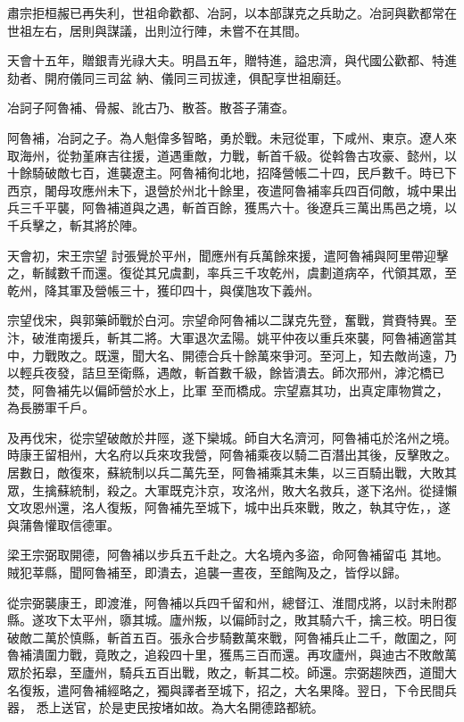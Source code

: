 \begin{pinyinscope}
 肅宗拒桓赧已再失利，世祖命歡都、冶訶，以本部謀克之兵助之。冶訶與歡都常在世祖左右，居則與謀議，出則泣行陣，未嘗不在其間。



 天會十五年，贈銀青光祿大夫。明昌五年，贈特進，謚忠濟，與代國公歡都、特進劾者、開府儀同三司盆
 納、儀同三司拔達，俱配享世祖廟廷。



 冶訶子阿魯補、骨赧、訛古乃、散荅。散荅子蒲查。



 阿魯補，冶訶之子。為人魁偉多智略，勇於戰。未冠從軍，下咸州、東京。遼人來取海州，從勃堇麻吉往援，道遇重敵，力戰，斬首千級。從斡魯古攻豪、懿州，以十餘騎破敵七百，進襲遼主。阿魯補徇北地，招降營帳二十四，民戶數千。時已下西京，闍母攻應州未下，退營於州北十餘里，夜遣阿魯補率兵四百伺敵，城中果出兵三千平襲，阿魯補道與之遇，斬首百餘，獲馬六十。後遼兵三萬出馬邑之境，以千兵擊之，斬其將於陣。



 天會初，宋王宗望
 討張覺於平州，聞應州有兵萬餘來援，遣阿魯補與阿里帶迎擊之，斬馘數千而還。復從其兄虞劃，率兵三千攻乾州，虞劃道病卒，代領其眾，至乾州，降其軍及營帳三十，獲印四十，與僕虺攻下義州。



 宗望伐宋，與郭藥師戰於白河。宗望命阿魯補以二謀克先登，奮戰，賞賚特異。至汴，破淮南援兵，斬其二將。大軍退次孟陽。姚平仲夜以重兵來襲，阿魯補適當其中，力戰敗之。既還，聞大名、開德合兵十餘萬來爭河。至河上，知去敵尚遠，乃以輕兵夜發，詰旦至衛縣，遇敵，斬首數千級，餘皆潰去。師次邢州，滹沱橋已焚，阿魯補先以偏師營於水上，比軍
 至而橋成。宗望嘉其功，出真定庫物賞之，為長勝軍千戶。



 及再伐宋，從宗望破敵於井陘，遂下欒城。師自大名濟河，阿魯補屯於洺州之境。時康王留相州，大名府以兵來攻我營，阿魯補乘夜以騎二百潛出其後，反擊敗之。居數日，敵復來，蘇統制以兵二萬先至，阿魯補乘其未集，以三百騎出戰，大敗其眾，生擒蘇統制，殺之。大軍既克汴京，攻洺州，敗大名救兵，遂下洺州。從撻懶文攻恩州還，洺人復叛，阿魯補先至城下，城中出兵來戰，敗之，執其守佐，，遂與蒲魯懽取信德軍。



 梁王宗弼取開德，阿魯補以步兵五千赴之。大名境內多盜，命阿魯補留屯
 其地。賊犯莘縣，聞阿魯補至，即潰去，追襲一晝夜，至館陶及之，皆俘以歸。



 從宗弼襲康王，即渡淮，阿魯補以兵四千留和州，總督江、淮間戍將，以討未附郡縣。遂攻下太平州，隳其城。廬州叛，以偏師討之，敗其騎六千，擒三校。明日復破敵二萬於慎縣，斬首五百。張永合步騎數萬來戰，阿魯補兵止二千，敵圍之，阿魯補潰圍力戰，竟敗之，追殺四十里，獲馬三百而還。再攻廬州，與迪古不敗敵萬眾於拓皋，至廬州，騎兵五百出戰，敗之，斬其二校。師還。宗弼趨陜西，道聞大名復叛，遣阿魯補經略之，獨與譯者至城下，招之，大名果降。翌日，下令民間兵器，
 悉上送官，於是吏民按堵如故。為大名開德路都統。




\end{pinyinscope}
